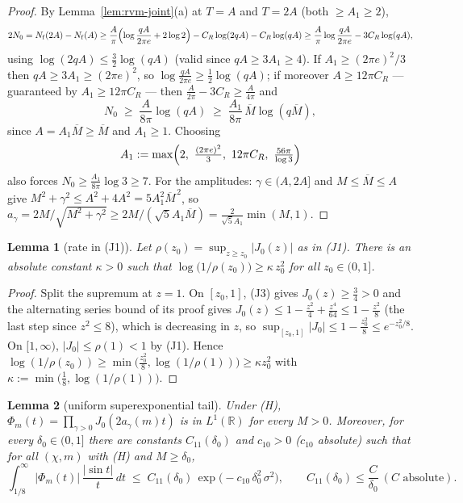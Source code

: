 \documentclass[11pt]{article}
\newtheorem{lemma}{Lemma}
\begin{document}
\begin{proof}
By Lemma~\ref{lem:rvm-joint}(a) at $T=A$ and $T=2A$ (both $\ge A_1\ge2$),
\[
2N_0=N_{\mathrm f}(2A)-N_{\mathrm f}(A)
\ge\frac{A}{\pi}\Bigl(\log\frac{qA}{2\pi e}+2\log2\Bigr)
-C_R\log(2qA)-C_R\log(qA)
\ge\frac{A}{\pi}\log\frac{qA}{2\pi e}-3C_R\log(qA),
\]
using $\log(2qA)\le\tfrac32\log(qA)$ (valid since $qA\ge3A_1\ge4$).
If $A_1\ge(2\pi e)^2/3$ then $qA\ge3A_1\ge(2\pi e)^2$, so
$\log\tfrac{qA}{2\pi e}\ge\tfrac12\log(qA)$; if moreover
$A\ge12\pi C_R$ --- guaranteed by $A_1\ge12\pi C_R$ --- then
$\tfrac{A}{2\pi}-3C_R\ge\tfrac{A}{4\pi}$ and
\[
N_0\;\ge\;\frac{A}{8\pi}\log(qA)\;\ge\;\frac{A_1}{8\pi}\,
\overline M\log(q\overline M),
\]
since $A=A_1\overline M\ge\overline M$ and $A_1\ge1$. Choosing
\[
A_1:=\max\Bigl(2,\ \tfrac{(2\pi e)^2}{3},\ 12\pi C_R,\
\tfrac{56\pi}{\log3}\Bigr)
\]
also forces $N_0\ge\tfrac{A_1}{8\pi}\log3\ge7$. For the amplitudes:
$\gamma\in(A,2A]$ and $M\le\overline M\le A$ give
$M^2+\gamma^2\le A^2+4A^2=5A_1^2\overline M^{\,2}$, so
$a_\gamma=2M/\sqrt{M^2+\gamma^2}
\ge2M/(\sqrt5A_1\overline M)=\tfrac{2}{\sqrt5A_1}\min(M,1)$.
\end{proof}

\begin{lemma}[rate in (J1)]\label{lem:rho-rate}
Let $\rho(z_0)=\sup_{z\ge z_0}|J_0(z)|$ as in (J1). There is an
absolute constant $\kappa>0$ such that
$\log\bigl(1/\rho(z_0)\bigr)\ge\kappa\,z_0^{2}$ for all
$z_0\in(0,1]$.
\end{lemma}

\begin{proof}
Split the supremum at $z=1$. On $[z_0,1]$, (J3) gives $J_0(z)\ge\tfrac34>0$
and the alternating series bound of its proof gives
$J_0(z)\le1-\tfrac{z^2}4+\tfrac{z^4}{64}\le1-\tfrac{z^2}8$ (the last
step since $z^2\le8$), which is decreasing in $z$, so
$\sup_{[z_0,1]}|J_0|\le1-\tfrac{z_0^2}8\le e^{-z_0^2/8}$. On
$[1,\infty)$, $|J_0|\le\rho(1)<1$ by (J1). Hence
$\log(1/\rho(z_0))\ge\min\bigl(\tfrac{z_0^2}8,\log(1/\rho(1))\bigr)
\ge\kappa z_0^2$ with $\kappa:=\min\bigl(\tfrac18,\log(1/\rho(1))\bigr)$.
\end{proof}

\begin{lemma}[uniform superexponential tail]\label{lem:bigt-joint}
Under (H), $\Phi_m(t)=\prod_{\gamma>0}J_0(2a_\gamma(m)t)$ is in
$L^1(\mathbb R)$ for every $M>0$. Moreover, for every
$\delta_0\in(0,1]$ there are constants $C_{11}(\delta_0)$ and
$c_{10}>0$ ($c_{10}$ absolute) such that for all $(\chi,m)$ with (H)
and $M\ge\delta_0$,
\begin{equation}\label{eq:tailq}
\int_{1/8}^\infty|\Phi_m(t)|\,\frac{|\sin t|}{t}\,dt
\;\le\;C_{11}(\delta_0)\,
\exp\bigl(-c_{10}\,\delta_0^{2}\,\sigma^{2}\bigr),
\qquad
C_{11}(\delta_0)\le\frac{C}{\delta_0}\ (C\text{ absolute}).
\end{equation}
\end{lemma}
\end{document}
